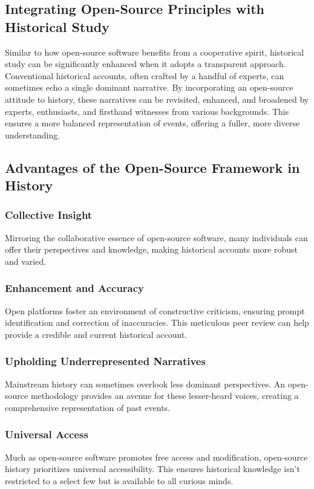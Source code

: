 \documentclass[a4paper,12pt]{book}
\begin{document}
\subsection*{Integrating Open-Source Principles with Historical Study}
Similar to how open-source software benefits from a cooperative spirit, historical study can be significantly enhanced when it adopts a transparent approach. Conventional historical accounts, often crafted by a handful of experts, can sometimes echo a single dominant narrative. By incorporating an open-source attitude to history, these narratives can be revisited, enhanced, and broadened by experts, enthusiasts, and firsthand witnesses from various backgrounds. This ensures a more balanced representation of events, offering a fuller, more diverse understanding.

\subsection*{Advantages of the Open-Source Framework in History}
\subsubsection*{Collective Insight}
Mirroring the collaborative essence of open-source software, many individuals can offer their perspectives and knowledge, making historical accounts more robust and varied.

\subsubsection*{Enhancement and Accuracy}
Open platforms foster an environment of constructive criticism, ensuring prompt identification and correction of inaccuracies. This meticulous peer review can help provide a credible and current historical account.

\subsubsection*{Upholding Underrepresented Narratives}
Mainstream history can sometimes overlook less dominant perspectives. An open-source methodology provides an avenue for these lesser-heard voices, creating a comprehensive representation of past events.

\subsubsection*{Universal Access}
Much as open-source software promotes free access and modification, open-source history prioritizes universal accessibility. This ensures historical knowledge isn't restricted to a select few but is available to all curious minds.
\end{document}
